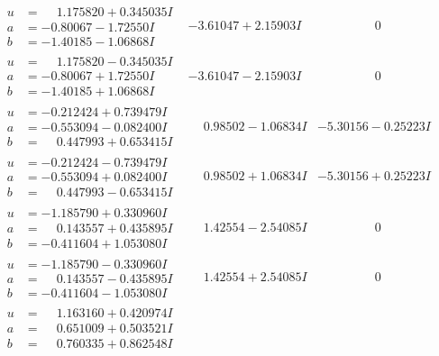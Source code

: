 \documentclass[1p]{elsarticle_modified}
\theoremstyle{definition}
\begin{document}
$$\begin{array}{c|c|c}
\begin{aligned}
u &= \phantom{-}1.175820 + 0.345035 I \\
a &= -0.80067 - 1.72550 I \\
b &= -1.40185 - 1.06868 I\end{aligned}
 & -3.61047 + 2.15903 I & \phantom{-0.000000 } 0 \\ \hline\begin{aligned}
u &= \phantom{-}1.175820 - 0.345035 I \\
a &= -0.80067 + 1.72550 I \\
b &= -1.40185 + 1.06868 I\end{aligned}
 & -3.61047 - 2.15903 I & \phantom{-0.000000 } 0 \\ \hline\begin{aligned}
u &= -0.212424 + 0.739479 I \\
a &= -0.553094 - 0.082400 I \\
b &= \phantom{-}0.447993 + 0.653415 I\end{aligned}
 & \phantom{-}0.98502 - 1.06834 I & -5.30156 - 0.25223 I \\ \hline\begin{aligned}
u &= -0.212424 - 0.739479 I \\
a &= -0.553094 + 0.082400 I \\
b &= \phantom{-}0.447993 - 0.653415 I\end{aligned}
 & \phantom{-}0.98502 + 1.06834 I & -5.30156 + 0.25223 I \\ \hline\begin{aligned}
u &= -1.185790 + 0.330960 I \\
a &= \phantom{-}0.143557 + 0.435895 I \\
b &= -0.411604 + 1.053080 I\end{aligned}
 & \phantom{-}1.42554 - 2.54085 I & \phantom{-0.000000 } 0 \\ \hline\begin{aligned}
u &= -1.185790 - 0.330960 I \\
a &= \phantom{-}0.143557 - 0.435895 I \\
b &= -0.411604 - 1.053080 I\end{aligned}
 & \phantom{-}1.42554 + 2.54085 I & \phantom{-0.000000 } 0 \\ \hline\begin{aligned}
u &= \phantom{-}1.163160 + 0.420974 I \\
a &= \phantom{-}0.651009 + 0.503521 I \\
b &= \phantom{-}0.760335 + 0.862548 I\end{aligned}

\end{array}$$
\end{document}
